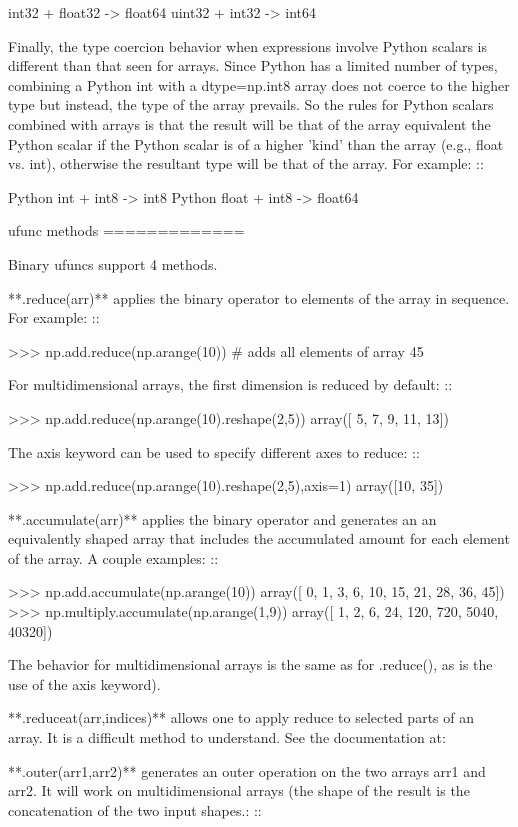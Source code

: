 \begin{DoxyVerb}
 int32 + float32 -> float64
 uint32 + int32 -> int64

Finally, the type coercion behavior when expressions involve Python
scalars is different than that seen for arrays. Since Python has a
limited number of types, combining a Python int with a dtype=np.int8
array does not coerce to the higher type but instead, the type of the
array prevails. So the rules for Python scalars combined with arrays is
that the result will be that of the array equivalent the Python scalar
if the Python scalar is of a higher 'kind' than the array (e.g., float
vs. int), otherwise the resultant type will be that of the array.
For example: ::

  Python int + int8 -> int8
  Python float + int8 -> float64

ufunc methods
=============

Binary ufuncs support 4 methods.

**.reduce(arr)** applies the binary operator to elements of the array in
  sequence. For example: ::

 >>> np.add.reduce(np.arange(10))  # adds all elements of array
 45

For multidimensional arrays, the first dimension is reduced by default: ::

 >>> np.add.reduce(np.arange(10).reshape(2,5))
 array([ 5,  7,  9, 11, 13])

The axis keyword can be used to specify different axes to reduce: ::

 >>> np.add.reduce(np.arange(10).reshape(2,5),axis=1)
 array([10, 35])

**.accumulate(arr)** applies the binary operator and generates an an
equivalently shaped array that includes the accumulated amount for each
element of the array. A couple examples: ::

 >>> np.add.accumulate(np.arange(10))
 array([ 0,  1,  3,  6, 10, 15, 21, 28, 36, 45])
 >>> np.multiply.accumulate(np.arange(1,9))
 array([    1,     2,     6,    24,   120,   720,  5040, 40320])

The behavior for multidimensional arrays is the same as for .reduce(),
as is the use of the axis keyword).

**.reduceat(arr,indices)** allows one to apply reduce to selected parts
  of an array. It is a difficult method to understand. See the documentation
  at:

**.outer(arr1,arr2)** generates an outer operation on the two arrays arr1 and
  arr2. It will work on multidimensional arrays (the shape of the result is
  the concatenation of the two input shapes.: ::


\end{DoxyVerb}

